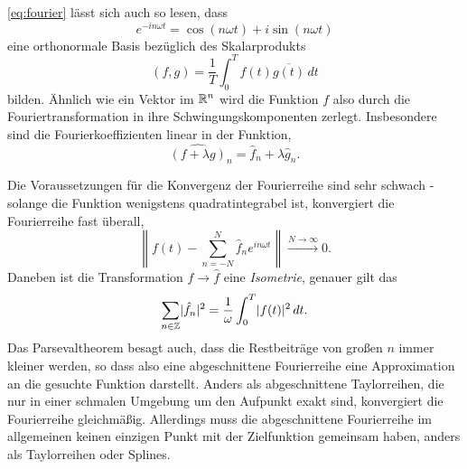 \eqref{eq:fourier} lässt sich auch so lesen, dass
\begin{equation}
  e^{-i n\omega t} = \cos(n \omega t) + i \sin(n \omega t)
\end{equation}
eine orthonormale Basis bezüglich des Skalarprodukts
\begin{equation}
  \label{eq:l2scalar}
  (f, g) = \frac{1}{T}\int_0^T f(t)\overline{g(t)}\,dt
\end{equation}
bilden. Ähnlich wie ein Vektor im $\mathbb{R}^n$ wird die Funktion $f$ also
durch die Fouriertransformation in ihre Schwingungskomponenten
zerlegt.  Insbesondere sind die Fourierkoeffizienten linear in der
Funktion, \dh
\begin{equation}
  \widehat{(f+\lambda g)}_n = \hat{f}_n +\lambda \hat{g}_n.
\end{equation}

Die Voraussetzungen für die Konvergenz der Fourierreihe sind sehr
schwach - solange die Funktion wenigstens quadratintegrabel ist,
konvergiert die Fourierreihe fast überall, \dh
\begin{equation}
  \left\lVert f(t) - \sum_{n=-N}^N \hat{f}_n e^{i n\omega t} \right\rVert \xrightarrow{N\to\infty} 0.
\end{equation}
Daneben ist die Transformation $f\to\hat{f}$ eine \emph{Isometrie},
genauer gilt das \emph{}
\begin{equation}
  \sum_{n\in\mathbb{Z}} \lvert\hat{f}_n\rvert^2 =
  \frac{1}{\omega}\int_0^T \lvert f(t)\rvert^2\,dt.
\end{equation}
Das Parsevaltheorem besagt auch, dass die Restbeiträge von großen $n$
immer kleiner werden, so dass also eine abgeschnittene Fourierreihe
eine Approximation an die gesuchte Funktion darstellt. Anders als
abgeschnittene Taylorreihen, die nur in einer schmalen Umgebung um den
Aufpunkt exakt sind, konvergiert die Fourierreihe
gleichmäßig. Allerdings muss die abgeschnittene Fourierreihe im
allgemeinen keinen einzigen Punkt mit der Zielfunktion gemeinsam
haben, anders als Taylorreihen oder Splines.


